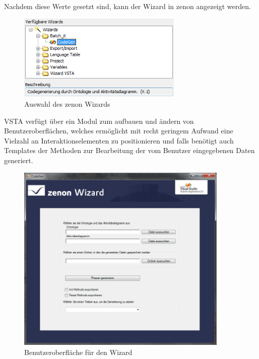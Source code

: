 Nachdem diese Werte gesetzt sind, kann der Wizard in zenon angezeigt werden.
\begin{figure}[hbt!]
  \centering
  \includegraphics[width=0.7\textwidth]{graphics/implementation/wizards}
  \caption{Auswahl des zenon Wizards}
\end{figure}

VSTA verfügt über ein Modul zum aufbauen und ändern von Benutzeroberflächen, welches ermöglicht mit recht geringem Aufwand eine Vielzahl an Interaktionselementen zu positionieren und falls benötigt auch Templates der Methoden zur Bearbeitung der vom Benutzer eingegebenen Daten generiert.

\begin{figure}[hbt!]
  \centering
  \includegraphics[width=0.9\textwidth]{graphics/implementation/wizard_final}
  \caption{Benutzeroberfläche für den Wizard}
\end{figure}